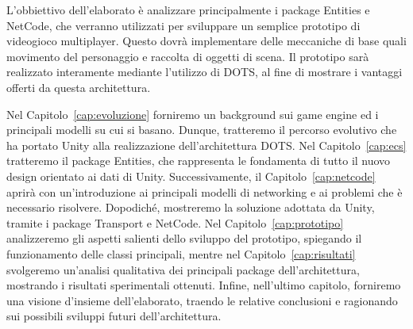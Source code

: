 L'obbiettivo dell'elaborato è analizzare principalmente i package Entities e NetCode, che verranno utilizzati per sviluppare un semplice prototipo di videogioco multiplayer. Questo dovrà implementare delle meccaniche di base quali movimento del personaggio e raccolta di oggetti di scena. Il prototipo sarà realizzato interamente mediante l'utilizzo di DOTS, al fine di mostrare i vantaggi offerti da questa architettura.


Nel Capitolo~\ref{cap:evoluzione} forniremo un background sui game engine ed i principali modelli su cui si basano. Dunque, tratteremo il percorso evolutivo che ha portato Unity alla realizzazione dell'architettura DOTS. Nel Capitolo~\ref{cap:ecs} tratteremo il package Entities, che rappresenta le fondamenta di tutto il nuovo design orientato ai dati di Unity. Successivamente, il Capitolo~\ref{cap:netcode} aprirà con un'introduzione ai principali modelli di networking e ai problemi che è necessario risolvere. Dopodiché, mostreremo la soluzione adottata da Unity, tramite i package Transport e NetCode. Nel Capitolo~\ref{cap:prototipo} analizzeremo gli aspetti salienti dello sviluppo del prototipo, spiegando il funzionamento delle classi principali, mentre nel Capitolo~\ref{cap:risultati} svolgeremo un'analisi qualitativa dei principali package dell'architettura, mostrando i risultati sperimentali ottenuti. Infine, nell'ultimo capitolo, forniremo una visione d'insieme dell'elaborato, traendo le relative conclusioni e ragionando sui possibili sviluppi futuri dell'architettura.
